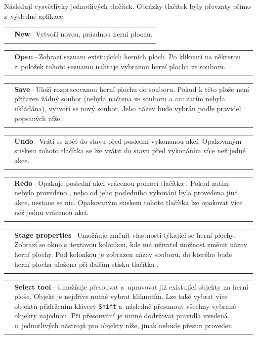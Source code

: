 \newcommand{\describeeditorbutton}[3]{
\noindent\begin{tabularx}{\textwidth}{lX}
    \scalebox{2}{\texttt{[image: \#2]}} & \textbf{#1}\,--\,#3 \\
    \\
\end{tabularx}
}

Následují vysvětlivky jednotlivých tlačítek. Obrázky tlačítek byly převzaty přímo z~výsledné aplikace.\\

\describeeditorbutton{New}{doc/obrazky-figures/new.png}{Vytvoří novou, prázdnou herní plochu.}

\describeeditorbutton{Open}{doc/obrazky-figures/open.png}{Zobrazí seznam existujících herních ploch. Po kliknutí na některou z~položek tohoto seznamu nahraje vybranou herní plochu ze souboru.}

\describeeditorbutton{Save}{doc/obrazky-figures/save.png}{Uloží rozpracovanou herní plochu do souboru. Pokud k této ploše není přiřazen žádný soubor (nebyla načtena ze souboru a ani zatím nebyla ukládána), vytvoří se nový soubor. Jeho název bude vybrán podle pravidel popsaných níže.}

\describeeditorbutton{Undo}{doc/obrazky-figures/undo.png}{Vrátí se zpět do stavu před poslední vykonanou akcí. Opakovaným stiskem tohoto tlačítka se lze vrátit do stavu před vykonáním více než jedné akce.}

\describeeditorbutton{Redo}{doc/obrazky-figures/redo.png}{Opakuje poslední akci vrácenou pomocí tlačítka \uv{Undo}. Pokud zatím nebylo provedeno \uv{undo}, nebo od jeho posledního vykonání byla provedena jiná akce, nestane se nic. Opakovaným stiskem tohoto tlačítka lze opakovat více než jednu vrácenou akci.}

\describeeditorbutton{Stage properties}{doc/obrazky-figures/cogwheel.png}{Umožňuje změnit vlastnosti týkající se herní plochy. Zobrazí se okno s~textovou kolonkou, kde má uživatel možnost změnit název herní plochy. Pod kolonkou je zobrazen název souboru, do kterého bude herní plocha uložena při dalším stisku tlačítka \uv{Save}.}

\describeeditorbutton{Select tool}{doc/obrazky-figures/select-tool.png}{Umožňuje přesouvat a~upravovat již existující objekty na herní ploše. Objekt je nejdříve nutné vybrat kliknutím. Lze také vybrat více objektů přidržením klávesy \texttt{Shift} a~následně přesunout všechny vybrané objekty najednou. Při přesouvání je nutné dodržovat pravidla uvedená u~jednotlivých nástrojů pro objekty níže, jinak nebude přesun proveden.}

